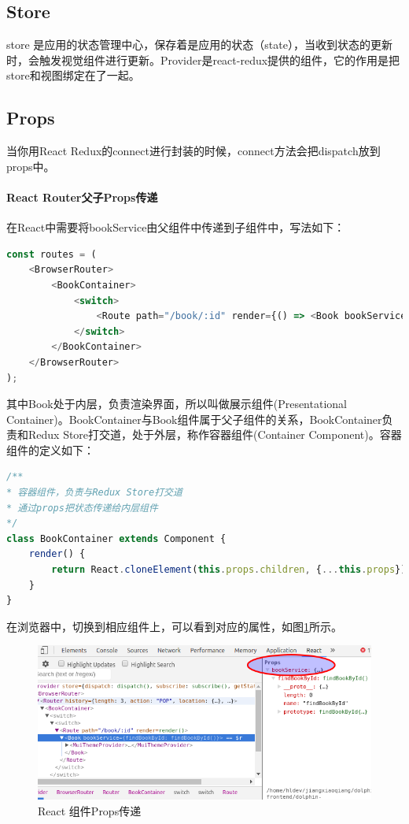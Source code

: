 \documentclass[letter]{book}
\begin{document}
\subsection{Store}

store 是应用的状态管理中心，保存着是应用的状态（state），当收到状态的更新时，会触发视觉组件进行更新。Provider是react-redux提供的组件，它的作用是把store和视图绑定在了一起。

\subsection{Props}

当你用React Redux的connect进行封装的时候，connect方法会把dispatch放到props中。

\paragraph{React Router父子Props传递}

在React中需要将bookService由父组件中传递到子组件中，写法如下：

\begin{lstlisting}[language=Javascript]
const routes = (
	<BrowserRouter>
		<BookContainer>
			<switch>
				<Route path="/book/:id" render={() => <Book bookService={bookService}/>}/>
			</switch>
		</BookContainer>
	</BrowserRouter>
);
\end{lstlisting}

其中Book处于内层，负责渲染界面，所以叫做展示组件(Presentational Container)。BookContainer与Book组件属于父子组件的关系，BookContainer负责和Redux Store打交道，处于外层，称作容器组件(Container Component)。容器组件的定义如下：

\begin{lstlisting}[language=Javascript]
/**
* 容器组件，负责与Redux Store打交道
* 通过props把状态传递给内层组件
*/
class BookContainer extends Component {
	render() {
		return React.cloneElement(this.props.children, {...this.props});
	}
}
\end{lstlisting}

在浏览器中，切换到相应组件上，可以看到对应的属性，如图\ref{fig:bookserviceprops}所示。

\begin{figure}[htbp]
	\centering
	\includegraphics[scale=0.5]{bookserviceprops.png}
	\caption{React 组件Props传递}
	\label{fig:bookserviceprops}
\end{figure}
\end{document}

